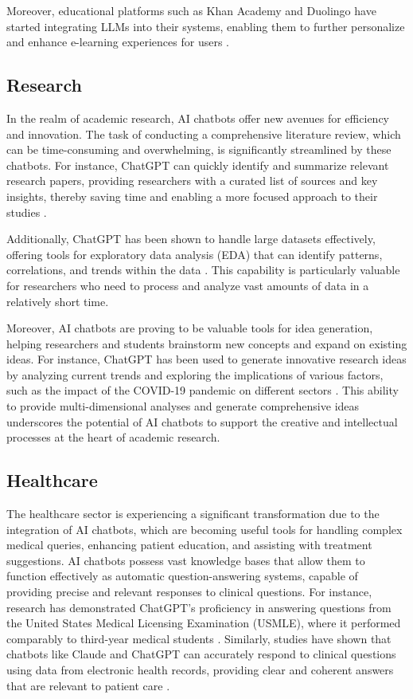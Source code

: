 Moreover, educational platforms such as Khan Academy and Duolingo have started integrating LLMs into their systems, enabling them to further personalize and enhance e-learning experiences for users \cite{khan2023harnessing, Duolingo2023}.

\subsection{Research}

In the realm of academic research, AI chatbots offer new avenues for efficiency and innovation. The task of conducting a comprehensive literature review, which can be time-consuming and overwhelming, is significantly streamlined by these chatbots. For instance, ChatGPT can quickly identify and summarize relevant research papers, providing researchers with a curated list of sources and key insights, thereby saving time and enabling a more focused approach to their studies \cite{chandha2023setting}.

Additionally, ChatGPT has been shown to handle large datasets effectively, offering tools for exploratory data analysis (EDA) that can identify patterns, correlations, and trends within the data \cite{jiang2023}. This capability is particularly valuable for researchers who need to process and analyze vast amounts of data in a relatively short time.

Moreover, AI chatbots are proving to be valuable tools for idea generation, helping researchers and students brainstorm new concepts and expand on existing ideas. For instance, ChatGPT has been used to generate innovative research ideas by analyzing current trends and exploring the implications of various factors, such as the impact of the COVID-19 pandemic on different sectors \cite{temsah2023reflection}. This ability to provide multi-dimensional analyses and generate comprehensive ideas underscores the potential of AI chatbots to support the creative and intellectual processes at the heart of academic research.

\subsection{Healthcare}

The healthcare sector is experiencing a significant transformation due to the integration of AI chatbots, which are becoming useful tools for handling complex medical queries, enhancing patient education, and assisting with treatment suggestions. AI chatbots possess vast knowledge bases that allow them to function effectively as automatic question-answering systems, capable of providing precise and relevant responses to clinical questions. For instance, research has demonstrated ChatGPT's proficiency in answering questions from the United States Medical Licensing Examination (USMLE), where it performed comparably to third-year medical students \cite{gilson2023does}. Similarly, studies have shown that chatbots like Claude and ChatGPT can accurately respond to clinical questions using data from electronic health records, providing clear and coherent answers that are relevant to patient care \cite{hamidi2023evaluation}.

